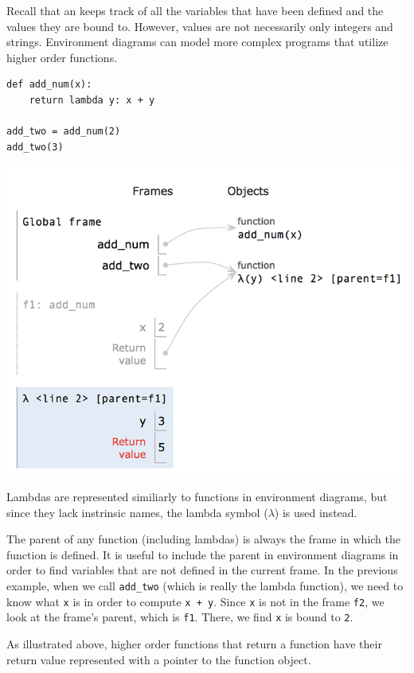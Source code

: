 Recall that an  keeps track of all the variables that have been defined and the values they are bound to.
However, values are not necessarily only integers and strings. Environment diagrams can model more complex programs that utilize higher order functions.

\setlength{\parindent}{0cm}
\begin{minipage}{0.4\textwidth}
\begin{lstlisting}[linewidth=\textwidth]
def add_num(x):
    return lambda y: x + y

add_two = add_num(2)
add_two(3)
\end{lstlisting}
\end{minipage}
\begin{minipage}{0.6\textwidth}
\includegraphics[width=\linewidth]{simple_hof_env.png}
\end{minipage}
Lambdas are represented similiarly to functions in environment diagrams, but
since they lack instrinsic names, the lambda symbol ($\lambda$) is used instead.

\begin{blocksection}
The parent of any function (including lambdas) is always the frame in which the
function is defined. It is useful to include the parent in environment diagrams
in order to find variables that are not defined in the current frame.
In the previous example, when we call \texttt{add\_two} (which is really the
lambda function), we need to know what \texttt{x} is in order to compute
\texttt{x + y}. Since \texttt{x} is not in the frame \texttt{f2}, we look at the
frame's parent, which is \texttt{f1}. There, we find \texttt{x} is bound to
\texttt{2}.

As illustrated above, higher order functions that return a function have their
return value represented with a pointer to the function object.
\end{blocksection}
